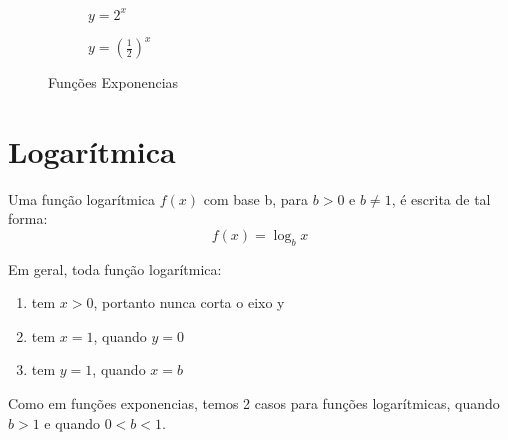 \begin{figure}[H]
\centering
	\begin{subfigure}[b]{0.4\linewidth}
	\centering
	\caption{$y=2^x$}
	\end{subfigure}
	\qquad
	\begin{subfigure}[b]{0.4\textwidth}
	\centering
	\caption{$y=(\frac{1}{2})^x$}
	\end{subfigure}
\caption{Funções Exponencias}
\end{figure}

\section{Logarítmica}
\begin{df}
Uma função logarítmica $f(x)$ com base b, para $b>0$ e $b \neq 1$, é escrita de tal forma:
\[f(x)=\log_b x\]
\end{df}
Em geral, toda função logarítmica:
\begin{enumerate}
\item tem $x>0$, portanto nunca corta o eixo y
\item tem $x=1$, quando $y=0$
\item tem $y=1$, quando $x=b$
\end{enumerate}
Como em funções exponencias, temos 2 casos para funções logarítmicas, quando $b>1$ e quando $0<b<1$.


